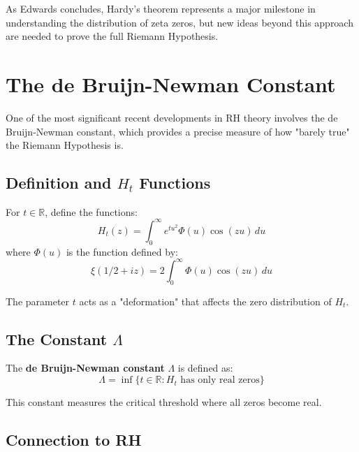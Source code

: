 As Edwards concludes, Hardy's theorem represents a major milestone in understanding the distribution of zeta zeros, but new ideas beyond this approach are needed to prove the full Riemann Hypothesis.

\section{The de Bruijn-Newman Constant}

One of the most significant recent developments in RH theory involves the de Bruijn-Newman constant, which provides a precise measure of how "barely true" the Riemann Hypothesis is.

\subsection{Definition and $H_t$ Functions}

\begin{definition}
For $t \in \mathbb{R}$, define the functions:
\begin{equation}
H_t(z) = \int_0^{\infty} e^{tu^2} \Phi(u) \cos(zu) \, du
\end{equation}
where $\Phi(u)$ is the function defined by:
\begin{equation}
\xi(1/2 + iz) = 2\int_0^{\infty} \Phi(u) \cos(zu) \, du
\end{equation}
\end{definition}

The parameter $t$ acts as a "deformation" that affects the zero distribution of $H_t$.

\subsection{The Constant $\Lambda$}

\begin{definition}
The \textbf{de Bruijn-Newman constant} $\Lambda$ is defined as:
\begin{equation}
\Lambda = \inf\{t \in \mathbb{R} : H_t \text{ has only real zeros}\}
\end{equation}
\end{definition}

This constant measures the critical threshold where all zeros become real.

\subsection{Connection to RH}

